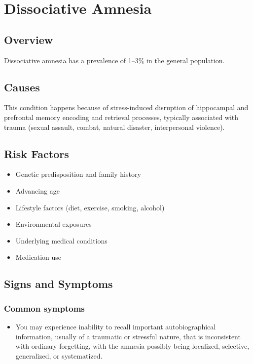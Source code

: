 \chapter{Dissociative Amnesia}
\label{sec:Dissociative Amnesia}

\section{Overview}
Dissociative amnesia has a prevalence of 1--3\% in the general population.
\section{Causes}
This condition happens because of stress-induced disruption of hippocampal and prefrontal memory encoding and retrieval processes, typically associated with trauma (sexual assault, combat, natural disaster, interpersonal violence).     
\section{Risk Factors}

\begin{itemize}[noitemsep]
  \item Genetic predisposition and family history
  \item Advancing age
  \item Lifestyle factors (diet, exercise, smoking, alcohol)
  \item Environmental exposures
  \item Underlying medical conditions
  \item Medication use
\end{itemize}
\section{Signs and Symptoms}

\subsection{Common symptoms}
\begin{itemize}[noitemsep]
  \item You may experience inability to recall important autobiographical information, usually of a traumatic or stressful nature, that is inconsistent with ordinary forgetting, with the amnesia possibly being localized, selective, generalized, or systematized. 
  \end{itemize}


